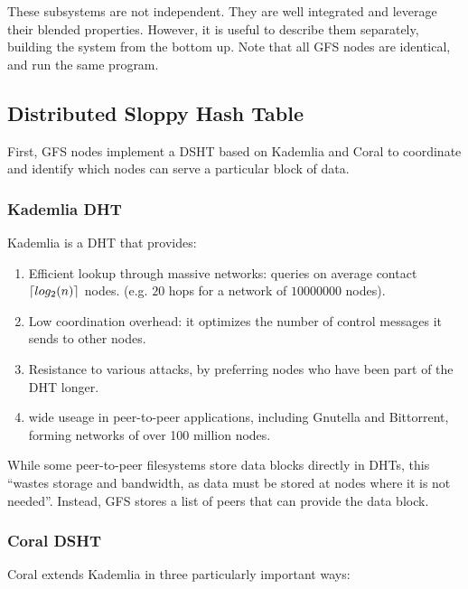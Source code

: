 \documentclass{sig-alternate}
\DeclarePairedDelimiter{\ceil}{\lceil}{\rceil}
\begin{document}
These subsystems are not independent. They are well integrated and leverage
their blended properties. However, it is useful to describe them separately,
building the system from the bottom up. Note that all GFS nodes are identical,
and run the same program.

\subsection{Distributed Sloppy Hash Table}

First, GFS nodes implement a DSHT based on Kademlia and Coral to coordinate
and identify which nodes can serve a particular block of data.

\subsubsection{Kademlia DHT}

Kademlia is a DHT that provides:

\begin{enumerate}

  \item Efficient lookup through massive networks:
        queries on average contact $ \ceil{log_2 (n)} $ nodes.
        (e.g. $20$ hops for a network of $10000000$ nodes).

  \item Low coordination overhead: it optimizes the number of
        control messages it sends to other nodes.

  \item Resistance to various attacks, by preferring nodes who have been
        part of the DHT longer.

  \item wide useage in peer-to-peer applications, including Gnutella and
        Bittorrent, forming networks of over 100 million nodes.

 \end{enumerate}

While some peer-to-peer filesystems store data blocks directly in DHTs,
this ``wastes storage and bandwidth, as data must be stored at nodes where it
is not needed''. Instead, GFS stores a list of peers that can provide the data block.

\subsubsection{Coral DSHT}

Coral extends Kademlia in three particularly important ways:
\end{document}
